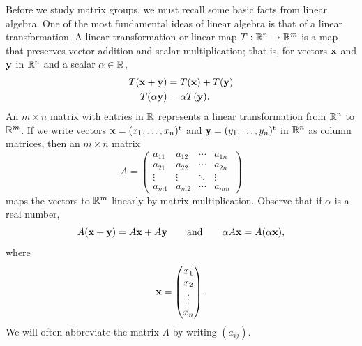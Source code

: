 Before we study matrix groups, we must recall some basic facts from
linear algebra.  One of the most fundamental ideas of linear algebra
is that of a linear transformation. A {\bfi linear
transformation\/} or {\bfi 
linear map} $T : {\Bbb R}^n \rightarrow {\Bbb R}^m$
is a map that preserves vector addition and scalar multiplication;
that is, for vectors ${\bold x}$ and ${\bold y}$ in ${\Bbb R}^n$ and a
scalar $\alpha \in {\Bbb R}$, 
\begin{align*}
T({\bold x}+{\bold y}) & = T({\bold x}) + T({\bold y}) \\
T(\alpha {\bold y}) & = \alpha T({\bold y}).
\end{align*}
An $m \times n$ matrix with entries in ${\Bbb R}$ represents a linear
transformation from ${\Bbb R}^n$ to ${\Bbb R}^m$. If we write vectors
${\bold x} = (x_1, \ldots, x_n)^{\rm t}$ and ${\bold y} = (y_1,
\ldots, y_n)^{\rm t}$ in ${\Bbb R}^n$ as column matrices, then an $m
\times n$ matrix 
\[
A
=
\begin{pmatrix}
a_{11} & a_{12} & \cdots & a_{1n} \\
a_{21} & a_{22} & \cdots & a_{2n} \\
\vdots & \vdots & \ddots & \vdots \\
a_{m1} & a_{m2} & \cdots & a_{mn}
\end{pmatrix}
\]
maps the vectors to ${\Bbb R}^m$ linearly by matrix
multiplication.  Observe that if $\alpha$ is a real number,
\[
A({\bold x} + {\bold y} ) 
 = 
A {\bold x }+ A {\bold y} 
\qquad \text{and} \qquad
\alpha A {\bold x} 
 = 
A ( \alpha {\bold x}),
\]
where
\[
{\bold x}
=
\begin{pmatrix}
x_1 \\
x_2 \\
\vdots \\
x_n
\end{pmatrix}.
\]
We will often abbreviate the matrix $A$ by writing
$(a_{ij})$\label{matrixnote}.  
 
